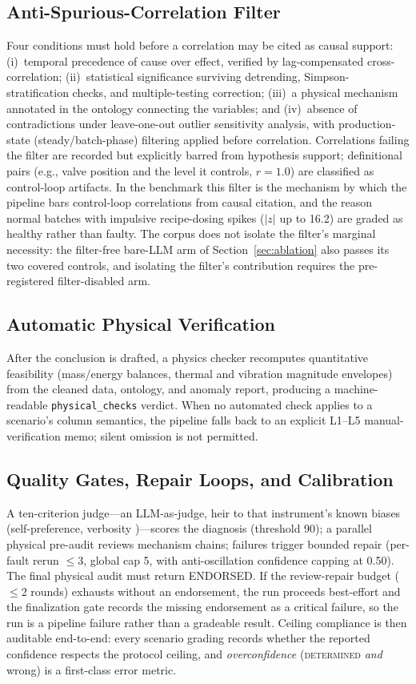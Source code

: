 \documentclass[preprint,10pt]{elsarticle}
\begin{document}
\subsection{Anti-Spurious-Correlation Filter}
Four conditions must hold before a correlation may be cited as causal support: (i)~temporal precedence of cause over effect, verified by lag-compensated cross-correlation; (ii)~statistical significance surviving detrending, Simpson-stratification checks, and multiple-testing correction; (iii)~a physical mechanism annotated in the ontology connecting the variables; and (iv)~absence of contradictions under leave-one-out outlier sensitivity analysis, with production-state (steady/batch-phase) filtering applied before correlation. Correlations failing the filter are recorded but explicitly barred from hypothesis support; definitional pairs (e.g., valve position and the level it controls, $r\!=\!1.0$) are classified as control-loop artifacts. In the benchmark this filter is the mechanism by which the pipeline bars control-loop correlations from causal citation, and the reason normal batches with impulsive recipe-dosing spikes ($|z|$ up to 16.2) are graded as healthy rather than faulty. The corpus does not isolate the filter's marginal necessity: the filter-free bare-LLM arm of Section~\ref{sec:ablation} also passes its two covered controls, and isolating the filter's contribution requires the pre-registered filter-disabled arm.

\subsection{Automatic Physical Verification}
After the conclusion is drafted, a physics checker recomputes quantitative feasibility (mass/energy balances, thermal and vibration magnitude envelopes) from the cleaned data, ontology, and anomaly report, producing a machine-readable \texttt{physical\_checks} verdict. When no automated check applies to a scenario's column semantics, the pipeline falls back to an explicit L1--L5 manual-verification memo; silent omission is not permitted.

\subsection{Quality Gates, Repair Loops, and Calibration}
A ten-criterion judge---an LLM-as-judge, heir to that instrument's known biases (self-preference, verbosity \cite{zheng2023judging,panickssery2024selfpref})---scores the diagnosis (threshold 90); a parallel physical pre-audit reviews mechanism chains; failures trigger bounded repair (per-fault rerun $\le$3, global cap 5, with anti-oscillation confidence capping at 0.50). The final physical audit must return ENDORSED. If the review-repair budget ($\le$2 rounds) exhausts without an endorsement, the run proceeds best-effort and the finalization gate records the missing endorsement as a critical failure, so the run is a pipeline failure rather than a gradeable result. Ceiling compliance is then auditable end-to-end: every scenario grading records whether the reported confidence respects the protocol ceiling, and \emph{overconfidence} (\mbox{\textsc{determined}} \emph{and} wrong) is a first-class error metric.
\end{document}
